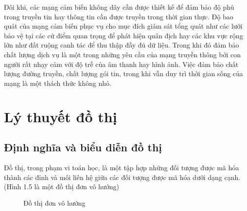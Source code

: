 Đôi khi, các mạng cảm biến không dây cần được thiết kế để đảm bảo độ phủ trong truyền tin hay thông tin cần được truyền trong thời gian thực. Độ bao quát của mạng cảm biến phục vụ cho mục đích giám sát tổng quát như các lưới bảo vệ tại các cứ điểm quan trọng để phát hiện quân địch hay các khu vực rộng lớn như đất ruộng canh tác để thu thập đầy đủ dữ liệu. Trong khi đó đảm bảo chất lượng dịch vụ là một trong những yêu cầu của mạng truyền thông bởi con người rất nhạy cảm với độ trễ của âm thanh hay hình ảnh. Việc đảm bảo chất lượng đường truyền, chất lượng gói tin, trong khi vẫn duy trì thời gian sống của mạng là một thách thức không nhỏ.

\section{Lý thuyết đồ thị}
\subsection{Định nghĩa và biểu diễn đồ thị}
Đồ thị, trong phạm vi toán học, là một tập hợp những đối tượng được mã hóa thành các đỉnh và mối liên hệ giữa các đối tượng được mã hóa dưới dạng cạnh. (Hình 1.5 là một đồ thị đơn vô hướng)


\begin{figure}[htb]
	\caption{\label{fig:my-label} Đồ thị đơn vô hướng}
\end{figure}
 
